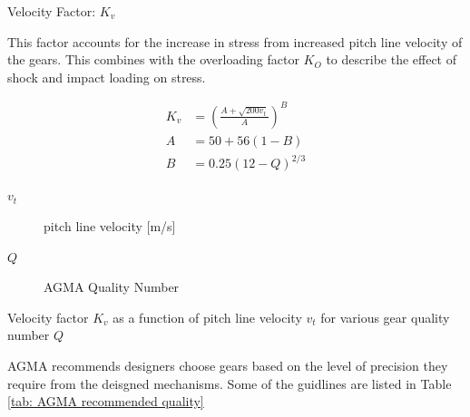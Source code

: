 \documentclass[a4paper,openany]{tufte-book}
\begin{document}
Velocity Factor: \(K_{v}\)

This factor accounts for the increase in stress from increased pitch line velocity of the gears. This combines with the overloading factor \(K_O\) to describe the effect of shock and impact loading on stress.

\begin{align}
  K_{v} &= \left( \frac{A + \sqrt{200 v_{t}}}{A} \right)^{B} \\
  A &= 50 + 56(1 - B) \\
  B &= 0.25(12 - Q)^{2/3}
\end{align}

\begin{description}
\item[{\(v_{t}\)}] pitch line velocity [m/s]

\item[{\(Q\)}] AGMA Quality Number
\end{description}

\begin{marginfigure}
  \centering
\caption{Velocity factor \(K_v\) as a function of pitch line velocity \(v_t\) for various gear quality number \(Q\)}
\end{marginfigure}

AGMA recommends designers choose gears based on the level of precision they require from the deisgned mechanisms. Some of the guidlines are listed in Table \ref{tab: AGMA recommended quality}
\end{document}

